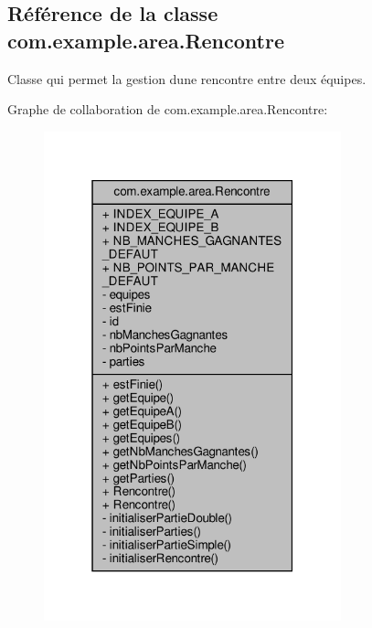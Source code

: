 \hypertarget{classcom_1_1example_1_1area_1_1_rencontre}{}\subsection{Référence de la classe com.\+example.\+area.\+Rencontre}
\label{classcom_1_1example_1_1area_1_1_rencontre}


Classe qui permet la gestion d\textquotesingle{}une rencontre entre deux équipes.  




Graphe de collaboration de com.\+example.\+area.\+Rencontre\+:
\nopagebreak
\begin{figure}[H]
\begin{center}
\leavevmode
\includegraphics[width=244pt]{classcom_1_1example_1_1area_1_1_rencontre__coll__graph}
\end{center}
\end{figure}
